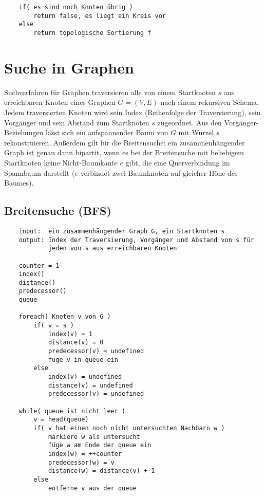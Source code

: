 \documentclass[10pt,a4paper,landscape]{article}
\begin{document}
\begin{multicols*}{2}
\begin{verbatim}
    if( es sind noch Knoten übrig )
        return false, es liegt ein Kreis vor
    else 
        return topologische Sortierung f
            \end{verbatim}

        \section{ Suche in Graphen }
            Suchverfahren für Graphen traversieren alle von einem Startknoten $s$ aus erreichbaren Knoten 
            eines Graphen $G = (V,E)$ nach einem rekursiven Schema. Jedem traversierten Knoten wird sein Index 
            (Reihenfolge der Traversierung), sein Vorgänger und sein Abstand zum Startknoten $s$ zugeordnet.
            Aus den Vorgänger-Beziehungen lässt sich ein aufspannender Baum von $G$ mit Wurzel $s$ rekonstruieren.
            \newline
            Außerdem gilt für die Breitensuche: ein zusammenhängender Graph ist genau dann bipartit, wenn es bei der Breitensuche mit beliebigem Startknoten 
            keine Nicht-Baumkante $e$ gibt, die eine Querverbindung im Spannbaum darstellt ($e$ verbindet zwei Baumknoten 
            auf gleicher Höhe des Baumes).
            \subsection{ Breitensuche (BFS) }
            \begin{verbatim}
    input:  ein zusammenhängender Graph G, ein Startknoten s
    output: Index der Traversierung, Vorgänger und Abstand von s für 
            jeden von s aus erreichbaren Knoten
    
    counter = 1
    index()
    distance()
    predecessor()
    queue

    foreach( Knoten v von G )
        if( v = s )
            index(v) = 1
            distance(v) = 0
            predecessor(v) = undefined
            füge v in queue ein
        else
            index(v) = undefined
            distance(v) = undefined
            predecessor(v) = undefined

    while( queue ist nicht leer )
        v = head(queue)
        if( v hat einen noch nicht untersuchten Nachbarn w )
            markiere w als untersucht
            füge w am Ende der queue ein
            index(w) = ++counter
            predecessor(w) = v
            distance(w) = distance(v) + 1
        else
            entferne v aus der queue


\end{verbatim}
\end{multicols*}
\end{document}

